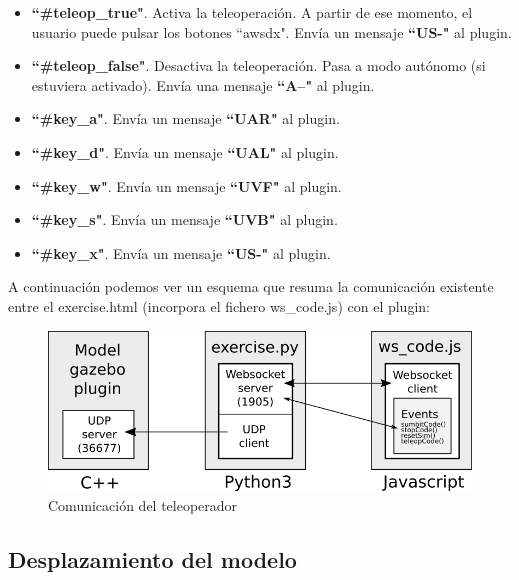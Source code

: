 \begin{itemize}
	\item \textbf{``\#teleop\_true"}. Activa la teleoperación. A partir de ese momento, el usuario puede pulsar los botones ``awsdx". Envía un mensaje \textbf{``US-"} al plugin.
	\item \textbf{``\#teleop\_false"}. Desactiva la teleoperación. Pasa a modo autónomo (si estuviera activado). Envía una mensaje \textbf{``A--"} al plugin.
	\item \textbf{``\#key\_a"}. Envía un mensaje \textbf{``UAR"} al plugin.
	\item \textbf{``\#key\_d"}. Envía un mensaje \textbf{``UAL"} al plugin.
	\item \textbf{``\#key\_w"}. Envía un mensaje \textbf{``UVF"} al plugin.
	\item \textbf{``\#key\_s"}. Envía un mensaje \textbf{``UVB"} al plugin.
	\item \textbf{``\#key\_x"}. Envía un mensaje \textbf{``US-"} al plugin.
\end{itemize}

A continuación podemos ver un esquema que resuma la comunicación existente entre el exercise.html (incorpora el fichero ws\_code.js) con el plugin:

\begin{figure} [H]
  \begin{center}
    \includegraphics[width=15cm]{imagenes/comunicacion-teleoperador.png}
  \end{center}
  \caption[Comunicación del teleoperador]{Comunicación del teleoperador}
  \label{fig:comunicacion_teleoperador}
\end{figure}

\subsection{Desplazamiento del modelo}
\label{subsec:desplazamiento_modelo}




